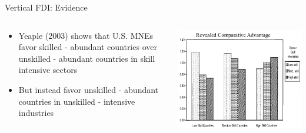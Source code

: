 \documentclass[10pt,hyperref={CJKbookmarks=true},xcolor=dvipsnames,aspectratio=169]{beamer}
\begin{document}
\begin{frame}{Vertical FDI: Evidence }


\begin{columns}[onlytextwidth]
\begin{column}{0.5\textwidth}
\begin{itemize}
\item Yeaple (2003) shows that U.S. MNEs favor skilled - abundant countries
over unskilled - abundant countries in skill intensive sectors 
\item But instead favor unskilled - abundant countries in unskilled - intensive
industries
\end{itemize}

\end{column}
\begin{column}{0.5\textwidth}
\includegraphics[width=\columnwidth]{fig/fdi/lec7-7}
\end{column}
\end{columns}

\end{frame}
\end{document}
